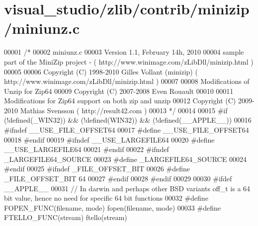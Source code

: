\hypertarget{visual__studio_2zlib_2contrib_2minizip_2miniunz_8c_source}{}\section{visual\+\_\+studio/zlib/contrib/minizip/miniunz.c}
\label{visual__studio_2zlib_2contrib_2minizip_2miniunz_8c_source}

\begin{DoxyCode}
00001 \textcolor{comment}{/*}
00002 \textcolor{comment}{   miniunz.c}
00003 \textcolor{comment}{   Version 1.1, February 14h, 2010}
00004 \textcolor{comment}{   sample part of the MiniZip project - ( http://www.winimage.com/zLibDll/minizip.html )}
00005 \textcolor{comment}{}
00006 \textcolor{comment}{         Copyright (C) 1998-2010 Gilles Vollant (minizip) ( http://www.winimage.com/zLibDll/minizip.html )}
00007 \textcolor{comment}{}
00008 \textcolor{comment}{         Modifications of Unzip for Zip64}
00009 \textcolor{comment}{         Copyright (C) 2007-2008 Even Rouault}
00010 \textcolor{comment}{}
00011 \textcolor{comment}{         Modifications for Zip64 support on both zip and unzip}
00012 \textcolor{comment}{         Copyright (C) 2009-2010 Mathias Svensson ( http://result42.com )}
00013 \textcolor{comment}{*/}
00014 
00015 \textcolor{preprocessor}{#if (!defined(\_WIN32)) && (!defined(WIN32)) && (!defined(\_\_APPLE\_\_))}
00016 \textcolor{preprocessor}{        #ifndef \_\_USE\_FILE\_OFFSET64}
00017 \textcolor{preprocessor}{                #define \_\_USE\_FILE\_OFFSET64}
00018 \textcolor{preprocessor}{        #endif}
00019 \textcolor{preprocessor}{        #ifndef \_\_USE\_LARGEFILE64}
00020 \textcolor{preprocessor}{                #define \_\_USE\_LARGEFILE64}
00021 \textcolor{preprocessor}{        #endif}
00022 \textcolor{preprocessor}{        #ifndef \_LARGEFILE64\_SOURCE}
00023 \textcolor{preprocessor}{                #define \_LARGEFILE64\_SOURCE}
00024 \textcolor{preprocessor}{        #endif}
00025 \textcolor{preprocessor}{        #ifndef \_FILE\_OFFSET\_BIT}
00026 \textcolor{preprocessor}{                #define \_FILE\_OFFSET\_BIT 64}
00027 \textcolor{preprocessor}{        #endif}
00028 \textcolor{preprocessor}{#endif}
00029 
00030 \textcolor{preprocessor}{#ifdef \_\_APPLE\_\_}
00031 \textcolor{comment}{// In darwin and perhaps other BSD variants off\_t is a 64 bit value, hence no need for specific 64 bit
       functions}
00032 \textcolor{preprocessor}{#define FOPEN\_FUNC(filename, mode) fopen(filename, mode)}
00033 \textcolor{preprocessor}{#define FTELLO\_FUNC(stream) ftello(stream)}

\end{DoxyCode}
